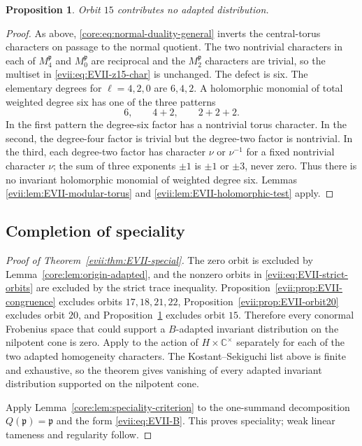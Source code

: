\documentclass[11pt,reqno]{amsart}
\numberwithin{equation}{section}
\newtheorem{proposition}[theorem]{Proposition}
\theoremstyle{definition}
\theoremstyle{remark}
\newcommand{\C}{\mathbb C}
\newcommand{\fp}{\mathfrak p}
\begin{document}
\begin{proposition}\label{evii:prop:EVII-orbit15}
Orbit $15$ contributes no adapted distribution.
\end{proposition}

\begin{proof}
As above, \eqref{core:eq:normal-duality-general} inverts the central-torus
characters on passage to the normal quotient.  The two nontrivial characters
in each of $M_4^{\fp}$ and $M_0^{\fp}$ are reciprocal and the $M_2^{\fp}$
characters are trivial, so the multiset in \eqref{evii:eq:EVII-z15-char} is
unchanged.  The defect is six.  The elementary degrees for $\ell=4,2,0$ are
$6,4,2$.  A holomorphic monomial of total weighted degree six has one of the
three patterns
\[
 6,
 \qquad
 4+2,
 \qquad
 2+2+2.
\]
In the first pattern the degree-six factor has a nontrivial torus character.
In the second, the degree-four factor is trivial but the degree-two factor is
nontrivial.  In the third, each degree-two factor has character $\nu$ or
$\nu^{-1}$ for a fixed nontrivial character $\nu$; the sum of three exponents
$\pm1$ is $\pm1$ or $\pm3$, never zero.  Thus there is no invariant
holomorphic monomial of weighted degree six.  Lemmas
\ref{evii:lem:EVII-modular-torus} and \ref{evii:lem:EVII-holomorphic-test} apply.
\end{proof}

\subsection{Completion of speciality}

\begin{proof}[Proof of Theorem~\ref{evii:thm:EVII-special}]
The zero orbit is excluded by Lemma~\ref{core:lem:origin-adapted}, and the
nonzero orbits in \eqref{evii:eq:EVII-strict-orbits} are excluded by the
strict trace inequality.  Proposition~\ref{evii:prop:EVII-congruence} excludes
orbits $17,18,21,22$, Proposition~\ref{evii:prop:EVII-orbit20} excludes orbit
$20$, and Proposition~\ref{evii:prop:EVII-orbit15} excludes orbit $15$.  Therefore
every conormal Frobenius space that could support a $B$-adapted invariant
distribution on the nilpotent cone is zero.  Apply
\cite[Theorem~2.5.6]{AG09} to the action of $H\times\C^\times$ separately
for each of the two adapted homogeneity characters.  The
Kostant--Sekiguchi list above is finite and exhaustive, so the theorem gives
vanishing of every adapted invariant distribution supported on the nilpotent
cone.

Apply Lemma~\ref{core:lem:speciality-criterion} to the one-summand decomposition
$Q(\fp)=\fp$ and the form \eqref{evii:eq:EVII-B}.  This proves speciality; weak
linear tameness and regularity follow.
\end{proof}
\end{document}
